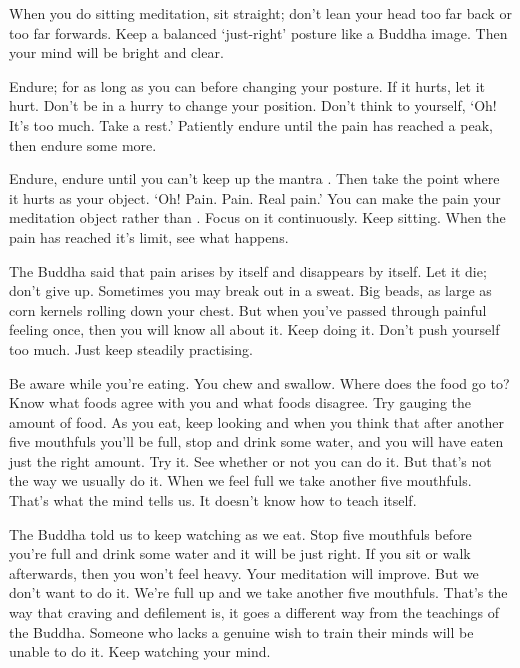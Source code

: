 When you do sitting meditation, sit straight; don't lean your head too far back or too far forwards. Keep a balanced `just-right' posture like a Buddha image. Then your mind will be bright and clear.

Endure; for as long as you can before changing your posture. If it hurts, let it hurt. Don't be in a hurry to change your position. Don't think to yourself, `Oh! It's too much. Take a rest.' Patiently endure until the pain has reached a peak, then endure some more.

Endure, endure until you can't keep up the mantra . Then take the point where it hurts as your object. `Oh! Pain. Pain. Real pain.' You can make the pain your meditation object rather than . Focus on it continuously. Keep sitting. When the pain has reached it's limit, see what happens.

The Buddha said that pain arises by itself and disappears by itself. Let it die; don't give up. Sometimes you may break out in a sweat. Big beads, as large as corn kernels rolling down your chest. But when you've passed through painful feeling once, then you will know all about it. Keep doing it. Don't push yourself too much. Just keep steadily practising.

Be aware while you're eating. You chew and swallow. Where does the food go to? Know what foods agree with you and what foods disagree. Try gauging the amount of food. As you eat, keep looking and when you think that after another five mouthfuls you'll be full, stop and drink some water, and you will have eaten just the right amount. Try it. See whether or not you can do it. But that's not the way we usually do it. When we feel full we take another five mouthfuls. That's what the mind tells us. It doesn't know how to teach itself.

The Buddha told us to keep watching as we eat. Stop five mouthfuls before you're full and drink some water and it will be just right. If you sit or walk afterwards, then you won't feel heavy. Your meditation will improve. But we don't want to do it. We're full up and we take another five mouthfuls. That's the way that craving and defilement is, it goes a different way from the teachings of the Buddha. Someone who lacks a genuine wish to train their minds will be unable to do it. Keep watching your mind.

